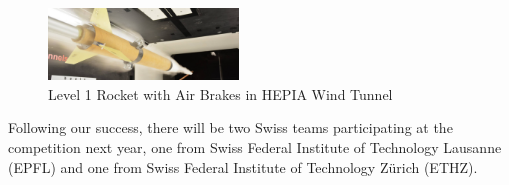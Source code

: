 \documentclass[]{iac}
\begin{document}
  \begin{figure}[h!]
 	\centering
        \includegraphics[width=0.45\textwidth]{img/level1.png}
        \caption{Level 1 Rocket with Air Brakes in HEPIA Wind Tunnel}
        \label{f:level1_airbrake}
 \end{figure}

Following our success, there will be two Swiss teams participating at the competition next year, one from Swiss Federal Institute of Technology Lausanne (EPFL) and one from Swiss Federal Institute of Technology  Zürich (ETHZ).


\printglossary[nonumberlist] 



\end{document}

